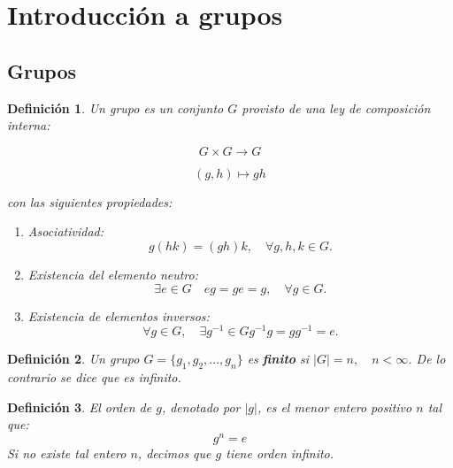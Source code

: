 \documentclass{report}
\newtheorem{definition}{Definición}
\begin{document}
\section{Introducción a grupos}

\subsection{Grupos}

\begin{definition}
 Un grupo es un conjunto \( G \) provisto de una ley de composición interna:

\[
G \times G \to G
\]

\[
(g,h) \mapsto gh
\]

con las siguientes propiedades:

\begin{enumerate}
    \item \textit{Asociatividad:}
    \[
    g(hk) = (gh)k, \quad \forall g,h,k \in G.
    \]
    
    \item \textit{Existencia del elemento neutro:}
    \[
    \exists e \in G \quad eg = ge = g, \quad \forall g \in G.
    \]
    
    \item \textit{Existencia de elementos inversos:}
    \[
    \forall g \in G, \quad \exists g^{-1} \in G  g^{-1} g = gg^{-1} = e.
    \]
  \end{enumerate}  

\end{definition}




\begin{definition}
Un grupo $G=\lbrace g_1,g_2,...,g_n\rbrace$ es \textbf{finito} si $|G|=n,\quad n<\infty$. De lo contrario se dice que es infinito.\\
\end{definition}


\begin{definition}
 El orden de \( g \), denotado por \( |g| \), es el menor entero positivo \( n \) tal que:
\[
g^n = e
\]
 Si no existe tal entero \( n \), decimos que \( g \) tiene orden infinito.
\end{definition}
\end{document}
